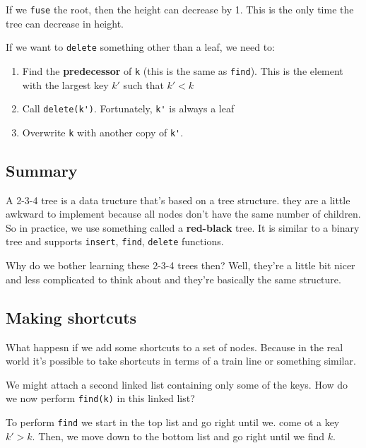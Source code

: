 \documentclass[11pt,a4paper,titlepage,dvipsnames,cmyk]{scrartcl}
\begin{document}
If we \lstinline|fuse| the root, then the height can decrease by 1. This
is the only time the tree can decrease in height.

If we want to \lstinline|delete| something other than a leaf, we need to:
\begin{enumerate}
    \item Find the \textbf{predecessor} of \lstinline|k| (this is the same
        as \lstinline|find|). This is the element with the largest key
        $k'$ such that $k' < k$
    \item Call \lstinline|delete(k')|. Fortunately, \lstinline|k'| is
        always a leaf
    \item Overwrite \lstinline|k| with another copy of \lstinline|k'|.
\end{enumerate}

\subsection{Summary}%
\label{sub:Summary}
A 2-3-4 tree is a data tructure that's based on a tree structure. they are
a little awkward to implement because all nodes don't have the same number
of children. So in practice, we use something called a
\textbf{red-black} tree. It is similar to a binary tree and supports
\lstinline|insert|, \lstinline|find|, \lstinline|delete| functions.

Why do we bother learning these 2-3-4 trees then? Well, they're a little
bit nicer and less complicated to think about and they're basically the
same structure.

\subsection{Making shortcuts}%
\label{sub:shortcuts}
What happesn if we add some shortcuts to a set of nodes. Because in the
real world it's possible to take shortcuts in terms of a train line or
something similar.

We might attach a second linked list containing only some of the keys. How
do we now perform \lstinline|find(k)| in this linked list?

To perform \lstinline|find| we start in the top list and go right until
we.  come ot a key $k' > k$. Then, we move down to the bottom list and go
right until we find $k$. 
\end{document}
